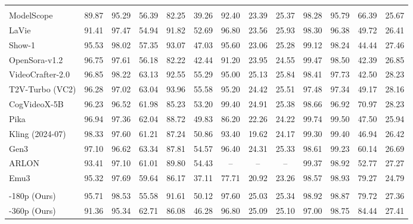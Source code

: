 \begin{table*}[t]
\begin{center}
{\begin{tabular}{lcccccccccccc}
    \hline \hline & \\[-2.0ex]
    ModelScope       & 89.87 & 95.29 & 56.39 & 82.25 & 39.26 & 92.40 & 23.39 & 25.37 & 98.28 & 95.79 & 66.39 & 25.67 \\    
    LaVie            & 91.41 & 97.47 & 54.94 & 91.82 & 52.69 & 96.80 & 23.56 & 25.93 & 98.30 & 96.38 & 49.72 & 26.41 \\
    Show-1           & 95.53 & 98.02 & 57.35 & 93.07 & 47.03 & 95.60 & 23.06 & 25.28 & 99.12 & 98.24 & 44.44 & 27.46 \\
    OpenSora-v1.2    & 96.75 & 97.61 & 56.18 & 82.22 & 42.44 & 91.20 & 23.95 & 24.55 & 99.47 & 98.50 & 42.39 & 26.85 \\
    VideoCrafter-2.0 & 96.85 & 98.22 & 63.13 & 92.55 & 55.29 & 95.00 & 25.13 & 25.84 & 98.41 & 97.73 & 42.50 & 28.23 \\
    T2V-Turbo (VC2)  & 96.28 & 97.02 & 63.04 & 93.96 & 55.58 & 95.20 & 24.42 & 25.51 & 97.48 & 97.34 & 49.17 & 28.16 \\
    CogVideoX-5B     & 96.23 & 96.52 & 61.98 & 85.23 & 53.20 & 99.40 & 24.91 & 25.38 & 98.66 & 96.92 & 70.97 & 28.23 \\
    Pika             & 96.94 & 97.36 & 62.04 & 88.72 & 49.83 & 86.20 & 22.26 & 24.22 & 99.74 & 99.50 & 47.50 & 25.94 \\
    Kling (2024-07)  & 98.33 & 97.60 & 61.21 & 87.24 & 50.86 & 93.40 & 19.62 & 24.17 & 99.30 & 99.40 & 46.94 & 26.42 \\
    Gen3             & 97.10 & 96.62 & 63.34 & 87.81 & 54.57 & 96.40 & 24.31 & 25.33 & 98.61 & 99.23 & 60.14 & 26.69 \\
    ARLON            & 93.41 & 97.10 & 61.01 & 89.80 & 54.43 & --    & --    & --    & 99.37 & 98.92 & 52.77 & 27.27 \\
    Emu3             & 95.32 & 97.69 & 59.64 & 86.17 & 37.11 & 77.71 & 20.92 & 23.26 & 98.57 & 98.93 & 79.27 & 24.79 \\
    \hline & \\[-2.0ex]
    \ours{}-180p (Ours)   & 95.71 & 98.53 & 55.58 & 91.61 & 50.12 & 97.60 & 25.03 & 25.34 & 98.92 & 98.87 & 79.72 & 27.36 \\
    \ours{}-360p (Ours)   & 91.36 & 95.34 & 62.71 & 86.08 & 46.28 & 96.80 & 25.09 & 25.10 & 97.00 & 98.75 & 84.44 & 27.41 \\
    \hline \hline
  \end{tabular}}
  \end{center}
  \label{tab:eval_vbench}
  \vspace{-5pt}
\end{table*}


